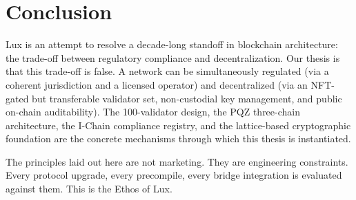 \section{Conclusion}


Lux is an attempt to resolve a decade-long standoff in blockchain
architecture: the trade-off between regulatory compliance and
decentralization. Our thesis is that this trade-off is false. A
network can be simultaneously regulated (via a coherent jurisdiction
and a licensed operator) and decentralized (via an NFT-gated but
transferable validator set, non-custodial key management, and public
on-chain auditability). The 100-validator design, the PQZ three-chain
architecture, the I-Chain compliance registry, and the lattice-based
cryptographic foundation are the concrete mechanisms through which
this thesis is instantiated.

The principles laid out here are not marketing. They are engineering
constraints. Every protocol upgrade, every precompile, every bridge
integration is evaluated against them. This is the Ethos of Lux.

